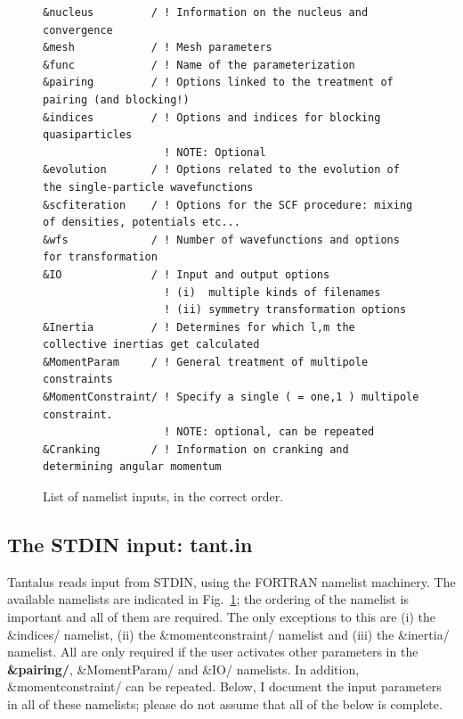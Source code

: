 \documentclass[print,amsmath,amssymb,aps,prc,nofootinbib,notitlepage]{revtex4-1}
\begin{document}
\begin{figure}[h]
\begin{minipage}{.9\textwidth}

\begin{Verbatim}[frame=single]
&nucleus         / ! Information on the nucleus and convergence
&mesh            / ! Mesh parameters
&func            / ! Name of the parameterization
&pairing         / ! Options linked to the treatment of pairing (and blocking!)
&indices         / ! Options and indices for blocking quasiparticles
                   ! NOTE: Optional
&evolution       / ! Options related to the evolution of the single-particle wavefunctions
&scfiteration    / ! Options for the SCF procedure: mixing of densities, potentials etc...
&wfs             / ! Number of wavefunctions and options for transformation
&IO              / ! Input and output options
                   ! (i)  multiple kinds of filenames  
                   ! (ii) symmetry transformation options
&Inertia         / ! Determines for which l,m the collective inertias get calculated
&MomentParam     / ! General treatment of multipole constraints
&MomentConstraint/ ! Specify a single ( = one,1 ) multipole constraint.
                   ! NOTE: optional, can be repeated
&Cranking        / ! Information on cranking and determining angular momentum
\end{Verbatim}
\end{minipage}
\caption{List of namelist inputs, in the correct order.}
\label{fig:namelists}
\end{figure}

\vspace{-1cm}
\subsection{The STDIN input: tant.in}
\label{sec:STDIN}

Tantalus reads input from STDIN, using the FORTRAN namelist machinery. The 
available namelists are indicated in Fig.~\ref{fig:namelists}; the ordering 
of the namelist is important and all of them are required. The only exceptions
to this are (i) the \textsf{\&indices/} namelist, 
           (ii) the \textsf{\&momentconstraint/} namelist
       and (iii) the \textsf{\&inertia/} namelist. All are only required if the 
       user activates other parameters in 
the \textbf{\&pairing/}, \textsf{\&MomentParam/} and \textsf{\&IO/} namelists. 
In addition, 
\textsf{\&momentconstraint/} can be repeated. Below, I document the input 
parameters in all of these namelists; please do not assume that all of the 
below is complete. 
\end{document}
